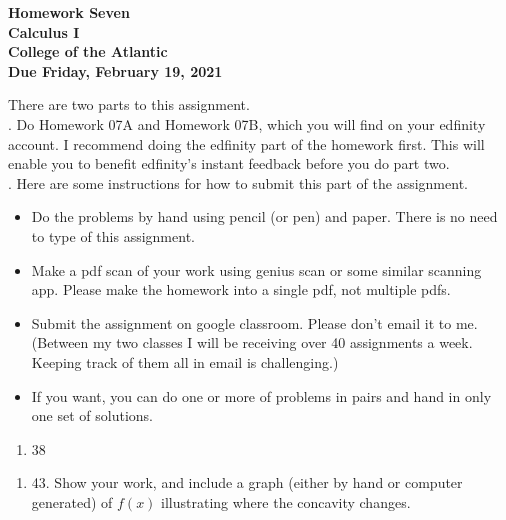 \documentclass[12pt]{article}
\begin{document}
\pagestyle{empty}
 
\begin{center}
{\LARGE {\bf Homework Seven}}\\
\bigskip
{\Large {\bf Calculus I}}\\
\bigskip
{\Large {\bf College of the Atlantic}}\\
\bigskip
{ {\bf Due Friday, February 19, 2021}}\\ 
\end{center}
\medskip


\noindent There are two parts to this assignment.\\

.  Do Homework 07A and Homework 07B,
which you will find on your edfinity account.  I recommend doing the
edfinity part of the homework first.  This will enable you to benefit
edfinity's instant feedback before you do part two.\\  


.  Here are some
instructions for how to submit this part of the assignment.
\begin{itemize}
\item Do the problems by hand using pencil (or pen) and paper.
  There is no need to type of this assignment.
\item Make a pdf scan of your work using genius scan or some
  similar scanning app.  Please make the homework into a single
  pdf, not multiple pdfs.
\item Submit the assignment on google classroom.  Please don't
  email it to me.  (Between my two classes I will be receiving
  over 40 assignments a week.  Keeping track of them all in email
  is challenging.)
\item If you want, you can do one or more of problems in pairs and hand 
  in only one set of solutions.\\
\end{itemize}




\begin{enumerate}
\setlength{\itemsep}{-1mm}
\item 38

\end{enumerate}



\begin{enumerate}
\setlength{\itemsep}{-1mm}
\item 43.  Show your work, and include a graph (either by hand or
  computer generated) of $f(x)$ illustrating where the concavity
  changes.  
\end{enumerate}
\end{document}
